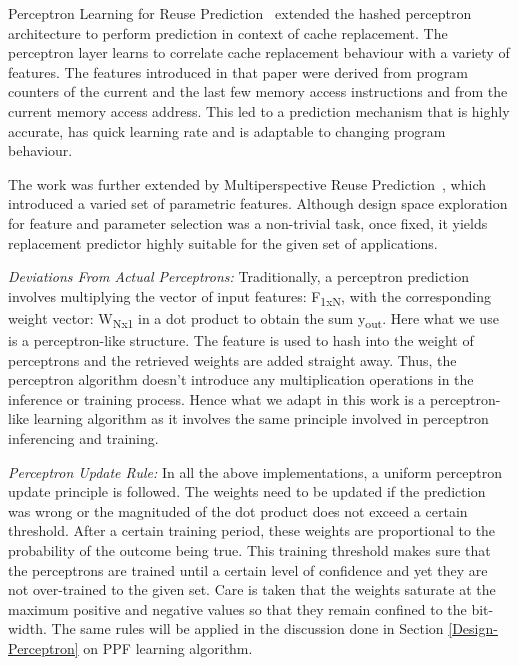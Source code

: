 
Perceptron Learning for Reuse Prediction~\cite{Perc_Reuse} extended the hashed
perceptron architecture to perform prediction in context of cache replacement.
The perceptron layer learns to correlate cache replacement behaviour with a
variety of features. The features introduced in that paper were derived from
program counters of the current and the last few memory access instructions
and from the current memory access address.  This led to a prediction
mechanism that is highly accurate, has quick learning rate and is adaptable to
changing program behaviour.

The work was further extended by Multiperspective Reuse
Prediction~\cite{Multiperspective}, which introduced a varied set of
parametric features.  Although design space exploration for feature and
parameter selection was a non-trivial task, once fixed, it yields
replacement predictor highly suitable for the given set of applications.

\textit{Deviations From Actual Perceptrons:} Traditionally, a perceptron
prediction involves multiplying the vector of input features:
F\textsubscript{1xN}, with the corresponding weight vector:
W\textsubscript{Nx1} in a dot product to obtain the sum y\textsubscript{out}.
Here what we use is a perceptron-like structure.  The feature is used to hash
into the weight of perceptrons and the retrieved weights are added straight
away.  Thus, the perceptron algorithm doesn't introduce any multiplication
operations in the inference or training process.  Hence what we adapt in this
work is a perceptron-like learning algorithm as it involves the same principle
involved in perceptron inferencing and training.

\textit{Perceptron Update Rule:} In all the above implementations, a uniform
perceptron update principle is followed.  The weights need to be updated if
the prediction was wrong or the magnituded of the dot product does not exceed
a certain threshold.  After a certain training period, these weights are
proportional to the probability of the outcome being true.  This training
threshold makes sure that the perceptrons are trained until a certain level of
confidence and yet they are not over-trained to the given set.  Care is taken
that the weights saturate at the maximum positive and negative values so that
they remain confined to the bit-width.  The same rules will be applied in the
discussion done in Section \ref{Design-Perceptron} on PPF learning algorithm.

